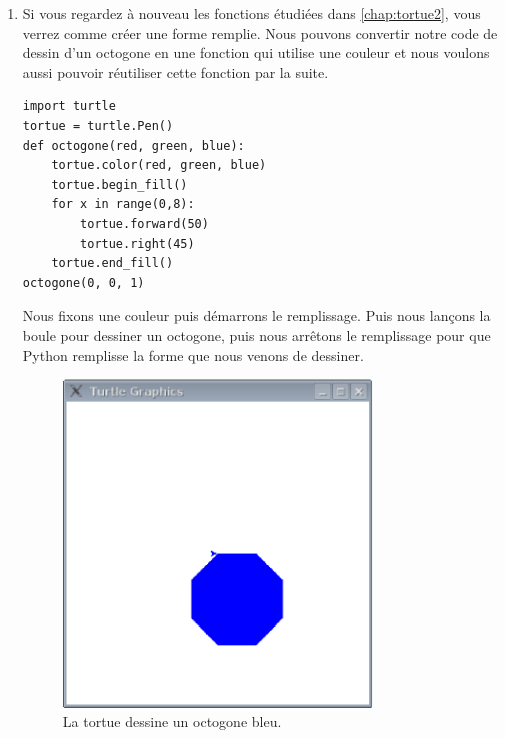\begin{enumerate}
\item Si vous regardez à nouveau les fonctions étudiées dans \autoref{chap:tortue2}, vous verrez comme créer une forme remplie. Nous pouvons convertir notre code de dessin d'un octogone en une fonction qui utilise une couleur et nous voulons aussi pouvoir réutiliser cette fonction par la suite.

\begin{Verbatim}[frame=single,rulecolor=\color{mbleu}, label=à taper]
import turtle
tortue = turtle.Pen()
def octogone(red, green, blue):
    tortue.color(red, green, blue)
    tortue.begin_fill()
    for x in range(0,8):
        tortue.forward(50)
        tortue.right(45)
    tortue.end_fill()
octogone(0, 0, 1)
\end{Verbatim}

Nous fixons une couleur puis démarrons le remplissage. Puis nous lançons la boule pour dessiner un octogone, puis nous arrêtons le remplissage pour que Python remplisse la forme que nous venons de dessiner. 


\begin{figure}
\begin{center}
\includegraphics[width=82mm]{images/octogonebleu.eps}
\end{center}
\caption{La tortue dessine un octogone bleu.}\label{fig:octogonebleu}
\end{figure}
\end{enumerate}